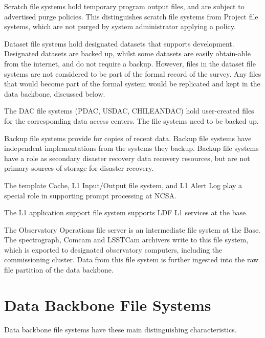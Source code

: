 \documentclass[toc,DM]{lsstdoc}
\begin{document}
Scratch file systems hold temporary program output files, and are
subject to advertised purge policies. This distinguishes scratch file
systems from Project file systems, which are not purged by system
administrator applying a policy.

Dataset file systems hold designated datasets that supports development.
Designated datasets are backed up, whilst some datasets are easily obtain-able
from the internet, and do not require a backup. However, files in the
dataset file systems are not considered to be part of the formal record of
the survey. Any files that would become part of the formal system would
be replicated and kept in the data backbone, discussed below.

The DAC file systems (PDAC, USDAC, CHILEANDAC) hold user-created files
for the corresponding data access centers. The file systems need to be
backed up.

Backup file systems provide for copies of recent data. Backup file
systems have independent implementations from the systems they backup.
Backup file systems have a role as secondary disaster recovery data
recovery resources, but are not primary sources of storage for disaster
recovery.

The template Cache, L1 Input/Output file system, and L1 Alert Log
play a special role in supporting prompt processing at NCSA.

The L1 application support file system supports LDF L1 services at the
base.

The Observatory Operations file server is an intermediate file system at
the Base. The spectrograph, Comcam and LSSTCam archivers write to this file
system, which is exported to designated observatory computers, including
the commissioning cluster. Data from this file system is further ingested
into the raw file partition of the data backbone.

\section{Data Backbone File Systems}

Data backbone file systems  have these main distinguishing
characteristics.
\end{document}
